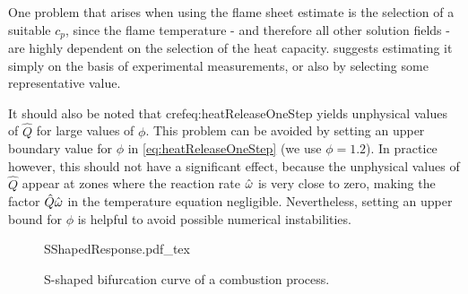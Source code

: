 One problem that arises when using the flame sheet estimate is the selection of a suitable $c_p$, since the flame temperature - and therefore all other solution fields - are highly dependent on the selection of the heat capacity. \cite{xuApplicationPrimitiveVariable1993} suggests estimating it simply on the basis of experimental measurements, or also by selecting some representative value.

It should also be noted that cref{eq:heatReleaseOneStep} yields unphysical values of $\hat Q$ for large values of $\phi$. This problem can be avoided by setting an upper boundary value for $\phi$ in \cref{eq:heatReleaseOneStep} (we use $\phi = 1.2$). In practice however, this should not have a significant effect, because the unphysical values of $\hat Q$ appear at zones where the reaction rate $\hat{\omega}$ is very close to zero, making the factor $\hat Q \hat{\omega}$ in the temperature equation negligible. Nevertheless, setting an upper bound for $\phi$ is helpful to avoid possible numerical instabilities.










\begin{figure}[t!]
	\begin{center}
		\def\svgwidth{0.5\textwidth}
		{SShapedResponse.pdf_tex}
		\caption{S-shaped bifurcation curve of a combustion process.}
		\label{fig:Sshaped}%
	\end{center}%
\end{figure}%


